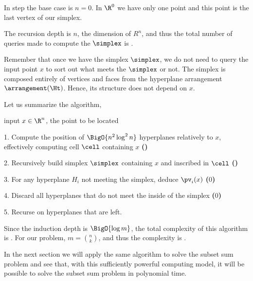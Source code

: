 In step  the base case is $n = 0$. In $\R^0$ we have only one point
and this point is the last vertex of our simplex.

The recursion depth is $n$, the dimension of $R^n$, and thus the total number
of queries made to compute the $\simplex$ is .

Remember that once we have the simplex $\simplex$, we do not need to query the
input point $x$ to sort out what meets the $\simplex$ or not. The simplex is
composed entirely of vertices and faces from the hyperplane arrangement
$\arrangement(\Ht)$. Hence, its structure does not depend on $x$.

Let us summarize the algorithm,

\begin{algorithm}
\item[input] $x \in \R^n$, the point to be located
\item[1.] Compute the position of $\BigO{n^2 \log^2 n}$ hyperplanes relatively to
$x$, effectively computing cell $\cell$ containing $x$ \textbf{()}
\item[2.] Recursively build simplex $\simplex$ containing $x$ and inscribed in $\cell$
\textbf{()}
\item[3.] For any hyperplane $H_i$ not meeting the simplex, deduce $\pv_i(x)$
\textbf{($0$)}
\item[4.] Discard all hyperplanes that do not meet the inside of the
simplex \textbf{($0$)}
\item[5.] Recurse on hyperplanes that are left.
\end{algorithm}

Since the induction depth is $\BigO{\log m}$, the total complexity of this algorithm
is . For our \kSUM problem, $m = \binom{n}{k}$,
and thus the complexity is .

In the next section we will apply the same algorithm to solve the
subset sum problem and see that, with this sufficiently powerful computing
model, it will be possible to solve the subset sum problem in polynomial time.

